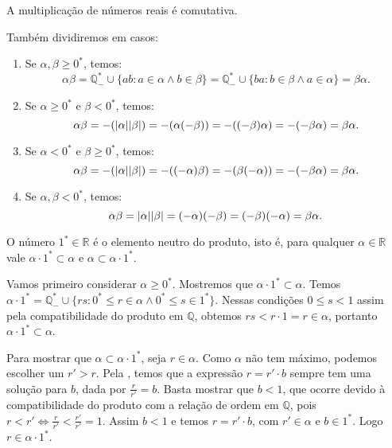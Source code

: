\documentclass[../main.tex]{subfiles}
\begin{document}
\begin{prop}\label{reais-prop-produtoComutativo}
    A multiplicação de números reais é comutativa.
\end{prop}
\begin{dem}
    Também dividiremos em casos:
    \begin{enumerate}
        \item Se $\alpha, \beta \geq 0^*$, temos: \\
            \[\alpha \beta = \mathbb{Q}_{-}^* \cup \{ ab : a \in \alpha \land b \in \beta \} = \mathbb{Q}_{-}^* \cup \{ ba: b \in \beta \land a \in \alpha \} = \beta\alpha.\]
        \item Se $\alpha \geq 0^*$ e $\beta < 0^*$, temos: \\
            \[ \alpha\beta = -(\abs{\alpha}\abs{\beta}) = -(\alpha(-\beta)) = -((-\beta)\alpha) = -(-\beta\alpha) = \beta\alpha .\]
        \item Se $\alpha < 0^*$ e $\beta \geq 0^*$, temos: \\
            \[ \alpha\beta = -(\abs{\alpha}\abs{\beta}) = -((-\alpha)\beta) = -(\beta(-\alpha)) = -(-\beta\alpha) = \beta\alpha .\]
        \item Se $\alpha, \beta < 0^*$, temos: \\
            \[ \alpha \beta = \abs{\alpha}\abs{\beta} = (-\alpha)(-\beta) = (-\beta)(-\alpha) = \beta\alpha .\]
    \end{enumerate}
\end{dem}

\begin{teo}\label{reais-teo-produtoNeutro}
    O número $1^* \in \mathbb{R}$ é o elemento neutro do produto, isto é, para qualquer $\alpha \in \mathbb{R}$ vale $\alpha \cdot 1^* \subset \alpha$ e $\alpha \subset \alpha \cdot 1^*$.
\end{teo}
\begin{dem}
    Vamos primeiro considerar $\alpha \geq 0^*$. Mostremos que $\alpha \cdot 1^* \subset \alpha$. Temos $\alpha \cdot 1^* = \mathbb{Q}_{-}^* \cup \{ rs : 0^* \leq r \in \alpha \land 0^* \leq s \in 1^*  \}$. Nessas condições $0 \leq s < 1$ assim pela compatibilidade do produto em $\mathbb{Q}$, obtemos $rs < r \cdot 1 = r \in \alpha$, portanto $\alpha \cdot 1^* \subset \alpha$.

    Para mostrar que $\alpha \subset \alpha \cdot 1^*$, seja $r \in \alpha$. Como $\alpha$ não tem máximo, podemos escolher um $r' > r$. Pela , temos que a expressão $r = r' \cdot b$ sempre tem uma solução para $b$, dada por $\frac{r}{r'} = b$. Basta mostrar que $b < 1$, que ocorre devido à compatibilidade do produto com a relação de ordem em $\mathbb{Q}$, pois 
    $r < r' \iff \frac{r}{r'} < \frac{r'}{r'} = 1$. Assim $b<1$ e temos $r = r' \cdot b$, com $r' \in \alpha$ e $b \in 1^*$. Logo $r \in \alpha \cdot 1^*$.
\end{dem}
\end{document}
